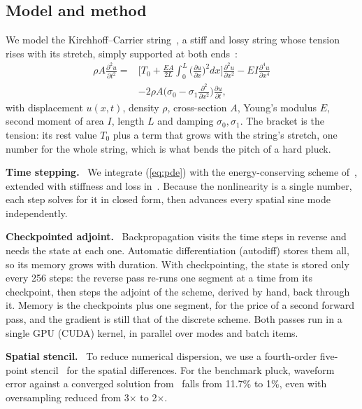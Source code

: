 \documentclass[a4paper]{article}
\newcommand{\head}[1]{\par\vspace{1pt}\noindent\textbf{#1.}\ \ignorespaces}
\begin{document}
\begin{sloppy}
\section{Model and method}
We model the Kirchhoff--Carrier string~\cite[Sec.~8.1]{bilbao2009}, a stiff
and lossy string whose tension rises with its stretch, simply supported at
both ends~\cite{russo2026}:
\begin{equation}
\begin{aligned}
\rho A\frac{\partial^2u}{\partial t^2}={}&
 \bigg[T_0+\frac{EA}{2L}\!\int_0^L\!\Big(\frac{\partial u}{\partial x}\Big)^{\!2}dx\bigg]
 \frac{\partial^2u}{\partial x^2}
 -EI\frac{\partial^4u}{\partial x^4}\\
 &-2\rho A\Big(\sigma_0-\sigma_1\frac{\partial^2}{\partial x^2}\Big)
 \frac{\partial u}{\partial t},
\end{aligned}
\label{eq:pde}
\end{equation}
with displacement $u(x,t)$, density $\rho$, cross-section $A$, Young's
modulus $E$, second moment of area $I$, length $L$ and damping
$\sigma_0,\sigma_1$. The bracket is the tension: its rest value $T_0$ plus a
term that grows with the string's stretch, one number for the whole string,
which is what bends the pitch of a hard pluck.

\head{Time stepping}
We integrate (\ref{eq:pde}) with the energy-conserving scheme
of~\cite[Sec.~8.1.2]{bilbao2009}, extended with stiffness and loss
in~\cite{russo2026}. Because the nonlinearity is a single number, each
step solves for it in closed form, then advances every spatial sine mode
independently.

\head{Checkpointed adjoint}
Backpropagation visits the time steps in reverse and needs the state at
each one. Automatic differentiation (autodiff) stores them all, so its
memory grows with duration. With checkpointing, the state is stored only
every 256 steps: the reverse pass re-runs one segment at a time from its
checkpoint, then steps the adjoint of the scheme, derived by hand, back
through it. Memory is the checkpoints plus one segment, for the price of a
second forward pass, and the gradient is still that of the discrete scheme.
Both passes run in a single GPU (CUDA) kernel, in parallel over modes and
batch items.

\head{Spatial stencil}
To reduce numerical dispersion, we use a fourth-order five-point
stencil~\cite[Sec.~6.3.1]{bilbao2009} for the spatial differences. For the benchmark pluck,
waveform error against a converged solution from~\cite{russo2026} falls from
11.7\% to 1\%, even with oversampling reduced from 3$\times$ to 2$\times$.


\end{sloppy}
\end{document}
